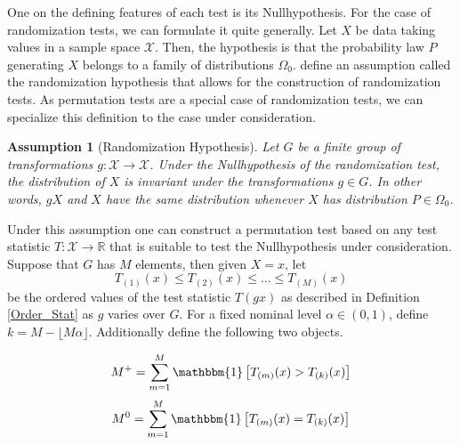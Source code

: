 \documentclass[12pt, a4paper]{article}
\theoremstyle{MAstyle} \newtheorem{assumption}{Assumption}[section]
\theoremstyle{MAstyle} \newtheorem{definition}{Definition}[section]
\begin{document}
			One on the defining features of each test is its Nullhypothesis. For the case of randomization tests, we can formulate it quite generally. Let $X$ be data taking values in a sample space $\mathcal{X}$. Then, the hypothesis is that the probability law $P$ generating $X$ belongs to a family of distributions $\Omega_0$. \cite{lehmann_testing_2005} define an assumption called the randomization hypothesis that allows for the construction of randomization tests. As permutation tests are a special case of randomization tests, we can specialize this definition to the case under consideration.
			\begin{assumption}[Randomization Hypothesis]\label{rand_hypo}
				 Let $G$ be a finite group of transformations $g: \mathcal{X} \rightarrow \mathcal{X}$. Under the Nullhypothesis of the randomization test, the distribution of $X$ is invariant under the transformations $g \in G$. In other words, $gX$ and $X$ have the same distribution whenever $X$ has distribution $P \in \Omega_0$.
			\end{assumption}
			Under this assumption one can construct a permutation test based on any test statistic $T:\mathcal{X} \rightarrow \mathbb{R}$ that is suitable to test the Nullhypothesis under consideration. Suppose that $G$ has $M$ elements, then given $X = x$, let 
			$$T_{(1)}(x) \leq T_{(2)}(x) \leq \dots \leq T_{(M)}(x) $$
			be the ordered values of the test statistic $T(gx)$ as described in Definition \ref{Order_Stat} as $g$ varies over $G$. For a fixed nominal level $\alpha \in (0,1)$, define $k = M - \lfloor M\alpha \rfloor$. Additionally define the following two objects.
			\begin{multicols}{2}
				\noindent
				\begin{equation*}
					M^{+} = \sum_{m = 1}^{M}\mathbbm{1}\left[T_{(m)}(x) > T_{(k)}(x)\right]
				\end{equation*}
				\begin{equation}
					M^{0} = \sum_{m = 1}^{M}\mathbbm{1}\left[T_{(m)}(x) = T_{(k)}(x)\right]
				\end{equation}
			\end{multicols}
			
\end{document}
